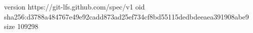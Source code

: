 version https://git-lfs.github.com/spec/v1
oid sha256:d3788a484767e49e92cadd873ad25ef734cf8bd55115dedbdeeaea391908abe9
size 109298
